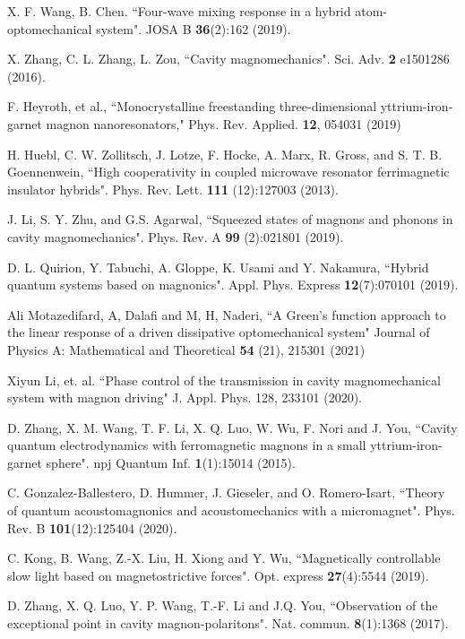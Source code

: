 \documentclass[aps,pra,superscriptaddress,balancelastpage,twocolumn]{revtex4}
\begin{document}
\begin{thebibliography}{99}
 X. F. Wang, B. Chen. ``Four-wave mixing response in a hybrid
atom-optomechanical system". JOSA B \textbf{36}(2):162 (2019).

 X. Zhang, C. L. Zhang, L. Zou, ``Cavity magnomechanics". Sci.
Adv. \textbf{2} e1501286 (2016).

 F. Heyroth, et al., ``Monocrystalline freestanding
three-dimensional yttrium-iron-garnet magnon nanoresonators," Phys. Rev.
Applied. \textbf{12}, 054031 (2019)

 H. Huebl, C. W. Zollitsch, J. Lotze, F. Hocke, A. Marx, R.
Gross, and S. T. B. Goennenwein, ``High cooperativity in coupled microwave
resonator ferrimagnetic insulator hybrids". Phys. Rev. Lett. \textbf{111}%
(12):127003 (2013).

 J. Li, S. Y. Zhu, and G.S. Agarwal, ``Squeezed states of
magnons and phonons in cavity magnomechanics". Phys. Rev. A \textbf{99}%
(2):021801 (2019).

 D. L. Quirion, Y. Tabuchi, A. Gloppe, K. Usami and Y.
Nakamura, ``Hybrid quantum systems based on magnonics". Appl. Phys. Express
\textbf{12}(7):070101 (2019).

 Ali Motazedifard, A, Dalafi and M, H, Naderi, ``A Green's
function approach to the linear response of a driven dissipative
optomechanical system" Journal of Physics A: Mathematical and Theoretical
\textbf{54} (21), 215301 (2021)

 Xiyun Li, et. al. ``Phase control of the transmission in
cavity magnomechanical system with magnon driving" J. Appl. Phys. 128,
233101 (2020).

 D. Zhang, X. M. Wang, T. F. Li, X. Q. Luo, W. Wu, F. Nori and
J. You, ``Cavity quantum electrodynamics with ferromagnetic magnons in a
small yttrium-iron-garnet sphere". npj Quantum Inf. \textbf{1}(1):15014
(2015).

 C. Gonzalez-Ballestero, D. Hummer, J. Gieseler, and O.
Romero-Isart, ``Theory of quantum acoustomagnonics and acoustomechanics with
a micromagnet". Phys. Rev. B \textbf{101}(12):125404 (2020).

 C. Kong, B. Wang, Z.-X. Liu, H. Xiong and Y. Wu,
``Magnetically controllable slow light based on magnetostrictive forces".
Opt. express \textbf{27}(4):5544 (2019).


 D. Zhang, X. Q. Luo, Y. P. Wang, T.-F. Li and J.Q. You,
``Observation of the exceptional point in cavity magnon-polaritons". Nat.
commun. \textbf{8}(1):1368 (2017).


\end{thebibliography}
\end{document}
